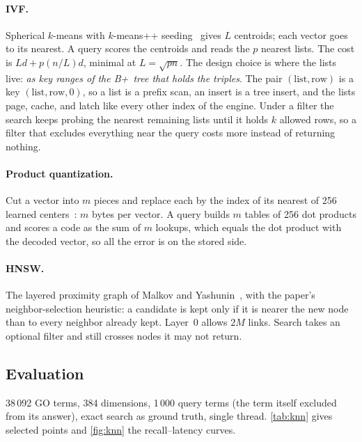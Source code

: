 \documentclass[sigconf, nonacm]{acmart}
\begin{document}
\paragraph{IVF.} Spherical $k$-means with $k$-means++ seeding~\cite{arthur2007} gives $L$ centroids; each vector goes to its nearest. A query scores the centroids and reads the $p$ nearest lists. The cost is $Ld + p(n/L)d$, minimal at $L=\sqrt{pn}$. The design choice is where the lists live: \emph{as key ranges of the B+~tree that holds the triples}. The pair $(\mathrm{list},\mathrm{row})$ is a key $(\mathrm{list},\mathrm{row},0)$, so a list is a prefix scan, an insert is a tree insert, and the lists page, cache, and latch like every other index of the engine. Under a filter the search keeps probing the nearest remaining lists until it holds $k$ allowed rows, so a filter that excludes everything near the query costs more instead of returning nothing.

\paragraph{Product quantization.} Cut a vector into $m$ pieces and replace each by the index of its nearest of 256 learned centers~\cite{jegou2011}: $m$ bytes per vector. A query builds $m$ tables of 256 dot products and scores a code as the sum of $m$ lookups, which equals the dot product with the decoded vector, so all the error is on the stored side.

\paragraph{HNSW.} The layered proximity graph of Malkov and Yashunin~\cite{malkov2020}, with the paper's neighbor-selection heuristic: a candidate is kept only if it is nearer the new node than to every neighbor already kept. Layer~0 allows $2M$ links. Search takes an optional filter and still crosses nodes it may not return.

\subsection{Evaluation}

38\,092 GO terms, 384 dimensions, 1\,000 query terms (the term itself excluded from its answer), exact search as ground truth, single thread. \autoref{tab:knn} gives selected points and \autoref{fig:knn} the recall--latency curves.
\end{document}
